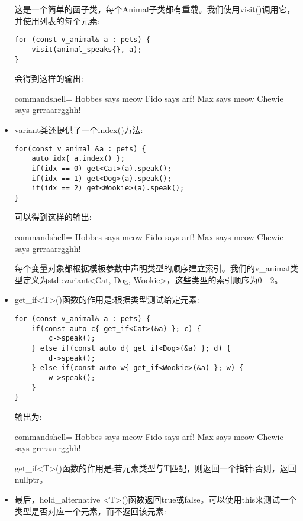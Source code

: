 \begin{itemize}
这是一个简单的函子类，每个Animal子类都有重载。我们使用visit()调用它，并使用列表的每个元素:

\begin{lstlisting}[style=styleCXX]
for (const v_animal& a : pets) {
	visit(animal_speaks{}, a);
}
\end{lstlisting}

会得到这样的输出:

\begin{tcblisting}{commandshell={}}
Hobbes says meow
Fido says arf!
Max says meow
Chewie says grrraarrgghh!
\end{tcblisting}

\item 
variant类还提供了一个index()方法:

\begin{lstlisting}[style=styleCXX]
for(const v_animal &a : pets) {
	auto idx{ a.index() };
	if(idx == 0) get<Cat>(a).speak();
	if(idx == 1) get<Dog>(a).speak();
	if(idx == 2) get<Wookie>(a).speak();
}
\end{lstlisting}

可以得到这样的输出:

\begin{tcblisting}{commandshell={}}
Hobbes says meow
Fido says arf!
Max says meow
Chewie says grrraarrgghh!
\end{tcblisting}

每个变量对象都根据模板参数中声明类型的顺序建立索引。我们的v\_animal类型定义为std::variant<Cat, Dog, Wookie>，这些类型的索引顺序为0 - 2。

\item 
get\_if<T>()函数的作用是:根据类型测试给定元素:

\begin{lstlisting}[style=styleCXX]
for (const v_animal& a : pets) {
	if(const auto c{ get_if<Cat>(&a) }; c) {
		c->speak();
	} else if(const auto d{ get_if<Dog>(&a) }; d) {
		d->speak();
	} else if(const auto w{ get_if<Wookie>(&a) }; w) {
		w->speak();
	}
}
\end{lstlisting}

输出为:

\begin{tcblisting}{commandshell={}}
Hobbes says meow
Fido says arf!
Max says meow
Chewie says grrraarrgghh!
\end{tcblisting}

get\_if<T>()函数的作用是:若元素类型与T匹配，则返回一个指针;否则，返回nullptr。

\item 
最后，hold\_alternative <T>()函数返回true或false。可以使用this来测试一个类型是否对应一个元素，而不返回该元素:


\end{itemize}
